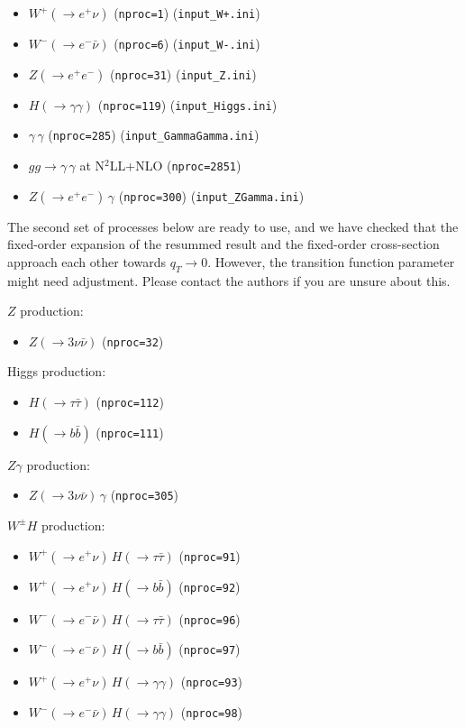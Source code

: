 \documentclass[
  11pt]{scrartcl}
\providecommand{\tightlist}{%
  \setlength{\itemsep}{0pt}\setlength{\parskip}{0pt}}
\begin{document}
\begin{itemize}
\tightlist
\item
  \(W^+(\to e^+ \nu)\) (\texttt{nproc=1}) (\texttt{input\_W+.ini})
\item
  \(W^-(\to e^- \bar\nu)\) (\texttt{nproc=6}) (\texttt{input\_W-.ini})
\item
  \(Z(\to e^+ e^-)\) (\texttt{nproc=31}) (\texttt{input\_Z.ini})
\item
  \(H(\to \gamma \gamma)\) (\texttt{nproc=119})
  (\texttt{input\_Higgs.ini})
\item
  \(\gamma\, \gamma\) (\texttt{nproc=285})
  (\texttt{input\_GammaGamma.ini})
\item
  \(gg \to \gamma\, \gamma\) at N\(^2\)LL+NLO (\texttt{nproc=2851})
\item
  \(Z(\to e^+ e^-)\, \gamma\) (\texttt{nproc=300})
  (\texttt{input\_ZGamma.ini})
\end{itemize}

The second set of processes below are ready to use, and we have checked that the
fixed-order expansion of the resummed result and the fixed-order
cross-section approach each other towards \(q_T\to0\). However, the transition
function parameter might need adjustment. Please contact the
authors if you are unsure about this.

\(Z\) production:

\begin{itemize}
\tightlist
\item
  \(Z(\to 3\nu \bar\nu)\) (\texttt{nproc=32})
\end{itemize}

Higgs production:

\begin{itemize}
\tightlist
\item
  \(H(\to \tau \bar\tau)\) (\texttt{nproc=112})
\item
  \(H(\to b \bar b)\) (\texttt{nproc=111})
\end{itemize}

\(Z\gamma\) production:

\begin{itemize}
\tightlist
\item
  \(Z(\to 3 \nu \bar\nu)\, \gamma\) (\texttt{nproc=305})
\end{itemize}

\(W^\pm H\) production:

\begin{itemize}
\tightlist
\item
  \(W^+(\to e^+ \nu )\, H(\to \tau \bar\tau)\) (\texttt{nproc=91})
\item
  \(W^+(\to e^+ \nu )\, H(\to b \bar b)\) (\texttt{nproc=92})
\item
  \(W^-(\to e^- \bar\nu )\, H(\to \tau \bar\tau)\) (\texttt{nproc=96})
\item
  \(W^-(\to e^- \bar\nu )\, H(\to b \bar b)\) (\texttt{nproc=97})
\item
  \(W^+(\to e^+ \nu )\, H(\to \gamma\gamma)\) (\texttt{nproc=93})
\item
  \(W^-(\to e^- \bar\nu )\, H(\to \gamma\gamma)\) (\texttt{nproc=98})
\end{itemize}
\end{document}
